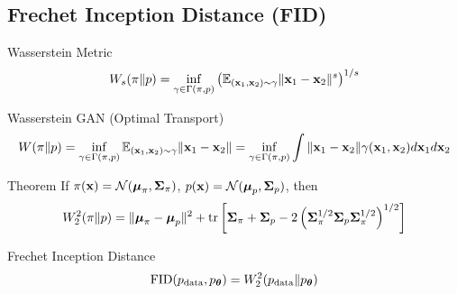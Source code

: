 \documentclass{beamer}
\renewcommand{\eqpause}{}
\begin{document}
\subsection{Frechet Inception Distance (FID)}
\begin{frame}{Wasserstein Metric}
	\vspace{-0.2cm}
	\[
		W_s(\pi \| p) = \inf_{\gamma \in \Gamma(\pi, p)} \left(\mathbb{E}_{(\mathbf{x}_1, \mathbf{x}_2) \sim \gamma} \| \mathbf{x}_1 - \mathbf{x}_2 \|^s\right)^{1/s}
	\]
	\eqpause
	\vspace{-0.3cm}
	\begin{block}{Wasserstein GAN (Optimal Transport)}
		\vspace{-0.5cm}
		{\small
		\[
			W(\pi \| p) = \inf_{\gamma \in \Gamma(\pi, p)} \mathbb{E}_{(\mathbf{x}_1, \mathbf{x}_2) \sim \gamma} \| \mathbf{x}_1 - \mathbf{x}_2 \| =  \inf_{\gamma\in {\Gamma(\pi, p)}} \int { \| \mathbf{x}_1 - \mathbf{x}_2 \|} {\gamma (\mathbf{x}_1, \mathbf{x}_2)} d \mathbf{x}_1 d \mathbf{x}_2
		\]
		}
		\vspace{-0.5cm}
	\end{block}
	\eqpause
	\begin{block}{Theorem}
		If $\pi(\mathbf{x}) = \mathcal{N}(\boldsymbol{\mu}_\pi, \boldsymbol{\Sigma}_\pi)$, $p(\mathbf{x}) = \mathcal{N}(\boldsymbol{\mu}_p, \boldsymbol{\Sigma}_p)$, then
		\vspace{-0.2cm}
		\[
			W_2^2(\pi \| p) = \| \boldsymbol{\mu}_{\pi} - \boldsymbol{\mu}_{p}\|^2 + \operatorname{tr} \left[ \boldsymbol{\Sigma}_{\pi} + \boldsymbol{\Sigma}_p - 2 \left(\boldsymbol{\Sigma}_{\pi}^{1/2} \boldsymbol{\Sigma}_p \boldsymbol{\Sigma}_{\pi}^{1/2} \right)^{1/2} \right]
		\]
		\vspace{-0.7cm}
	\end{block}
	\eqpause
	\begin{block}{Frechet Inception Distance}
		\vspace{-0.3cm}
		\[
			\mathrm{FID} (p_{\text{data}}, p_{\boldsymbol{\theta}}) =  W_2^2(p_{\text{data}} \| p_{\boldsymbol{\theta}})
		\]
		\vspace{-0.6cm}
	\end{block}
\end{frame}
\end{document}
